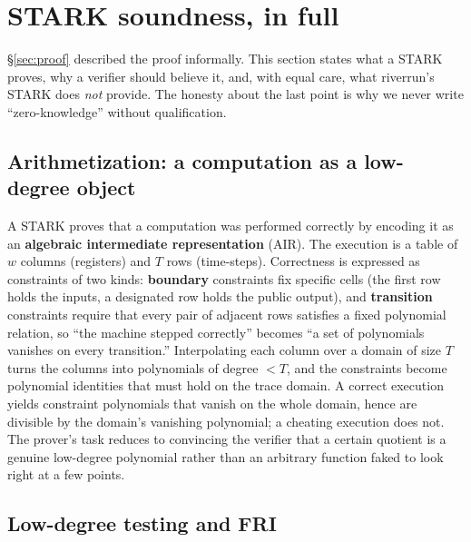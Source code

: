 \documentclass[11pt]{article}
\begin{document}
\section{STARK soundness, in full}
\label{sec:math-stark}

\S\ref{sec:proof} described the proof informally. This section states what a STARK proves,
why a verifier should believe it, and, with equal care, what riverrun's STARK does
\emph{not} provide. The honesty about the last point is why we never write
``zero-knowledge'' without qualification.

\subsection{Arithmetization: a computation as a low-degree object}

A STARK proves that a computation was performed correctly by encoding it as an
\textbf{algebraic intermediate representation} (AIR). The execution is a table of $w$
columns (registers) and $T$ rows (time-steps). Correctness is expressed as constraints of
two kinds: \textbf{boundary} constraints fix specific cells (the first row holds the
inputs, a designated row holds the public output), and \textbf{transition} constraints
require that every pair of adjacent rows satisfies a fixed polynomial relation, so ``the
machine stepped correctly'' becomes ``a set of polynomials vanishes on every transition.''
Interpolating each column over a domain of size $T$ turns the columns into polynomials of
degree $< T$, and the constraints become polynomial identities that must hold on the trace
domain. A correct execution yields constraint polynomials that vanish on the whole domain,
hence are divisible by the domain's vanishing polynomial; a cheating execution does not.
The prover's task reduces to convincing the verifier that a certain quotient is a genuine
low-degree polynomial rather than an arbitrary function faked to look right at a few
points.

\subsection{Low-degree testing and FRI}
\end{document}
